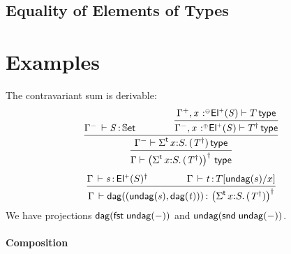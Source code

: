\documentclass[11pt]{article}
\theoremstyle{plain}
\begin{document}

\subsection{Equality of Elements of Types}



\section{Examples}

The contravariant sum is derivable:
\begin{equation}
	\infer{
		\wftp{ \Gamma }{ \paren{\sigmatp{x}{S}{(T^\dagger)}}^\dagger }
	}{
		\infer{
			\wftp{ \Gamma^- }{ \sigmatp{x}{S}{(T^\dagger)} }
		}{
			\ofdtp{ \Gamma^- }{ S }{ \types }
			\qquad \qquad
			\infer{
				\wftp{\Gamma^-, \tpvar{x}{\coc}{\Elp S}}{T^\dagger}
			}{
				\wftp{\Gamma^+, \tpvar{x}{\conc}{\Elp S}}{T}
			}
		}	
	}
\end{equation}
\begin{equation}
	\infer{
		\oftp{\Gamma}{\dagtm{(\undag s, \dagtm t)}}{ \paren{\sigmatp{x}{S}{(T^\dagger)}}^\dagger }
	}{
		\oftp{\Gamma}{s}{\Elp S^\dagger}
		\qquad \qquad
		\oftp{\Gamma}{t}{\subst T {\undag s} x}
	}
\end{equation}
We have projections $\mathsf{dag}(\mathit{\mathsf{fst}_{} \: \mathsf{undag}(-)})$ and $\mathsf{undag}(\mathit{\mathsf{snd}_{} \: \mathsf{undag}(-)})$.

\paragraph{Composition}


\end{document}

